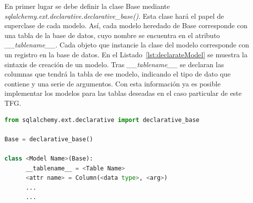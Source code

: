 En primer lugar se debe definir la clase Base mediante \textit{sqlalchemy.ext.declarative.declarative\_base()}. Esta clase hará el papel de superclase de cada modelo. Así, cada modelo heredado de Base corresponde con una tabla de la base de datos, cuyo nombre se encuentra en el atributo \textit{\_\_tablename\_\_}. Cada objeto que instancie la clase del modelo corresponde con un registro en la base de datos. En el Listado~\ref{lst:declarateModel} se muestra la sintaxis de creación de un modelo. Tras \textit{\_\_tablename\_\_} se declaran las columnas que tendrá la tabla de ese modelo, indicando el tipo de dato que contiene y una serie de argumentos. Con esta información ya es posible implementar los modelos para las tablas deseadas en el caso particular de este \gls{TFG}.
\begin{lstlisting}[language=Python,float=ht,caption={Declaración de un modelo heredado de \textit{Base}},label={lst:declarateModel}]
from sqlalchemy.ext.declarative import declarative_base

Base = declarative_base()

class <Model Name>(Base):
      __tablename__ = <Table Name>
      <attr name> = Column(<data type>, <arg>)
      ...
      ...
\end{lstlisting}

